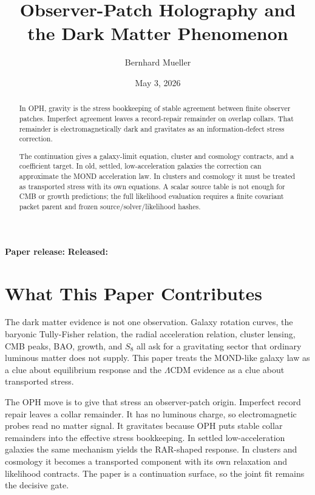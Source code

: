 \documentclass[11pt]{article}
\title{Observer-Patch Holography and the Dark Matter Phenomenon}
\author{Bernhard Mueller}
\date{May 3, 2026}
\begin{document}
\maketitle
\begin{center}
\small\textbf{Paper release:} \OPHPaperReleaseID\quad
\textbf{Released:} \OPHPaperReleaseDate
\end{center}

\begin{abstract}
In OPH, gravity is the stress bookkeeping of stable agreement between finite observer patches. Imperfect agreement leaves a record-repair remainder on overlap collars. That remainder is electromagnetically dark and gravitates as an information-defect stress correction.

The continuation gives a galaxy-limit equation, cluster and cosmology contracts, and a coefficient target. In old, settled, low-acceleration galaxies the correction can approximate the MOND acceleration law. In clusters and cosmology it must be treated as transported stress with its own equations. A scalar source table is not enough for CMB or growth predictions; the full likelihood evaluation requires a finite covariant packet parent and frozen source/solver/likelihood hashes.
\end{abstract}

\section*{What This Paper Contributes}

The dark matter evidence is not one observation. Galaxy rotation curves, the baryonic
Tully-Fisher relation, the radial acceleration relation, cluster lensing, CMB peaks, BAO, growth,
and \(S_8\) all ask for a gravitating sector that ordinary luminous matter does not supply. This
paper treats the MOND-like galaxy law as a clue about equilibrium response and the \(\Lambda\)CDM
evidence as a clue about transported stress.

The OPH move is to give that stress an observer-patch origin. Imperfect record repair leaves a
collar remainder. It has no luminous charge, so electromagnetic probes read no matter signal. It
gravitates because OPH puts stable collar remainders into the effective stress bookkeeping.
In settled low-acceleration galaxies the same mechanism yields the RAR-shaped response. In
clusters and cosmology it becomes a transported component with its own relaxation and likelihood
contracts. The paper is a continuation surface, so the joint fit remains the decisive gate.
\end{document}
